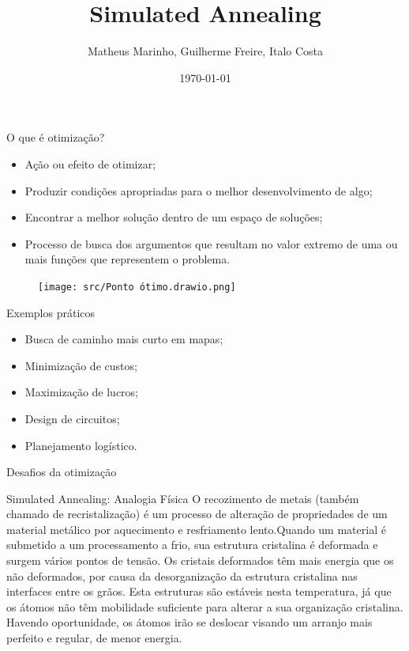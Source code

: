 \documentclass{beamer}
\title{Simulated Annealing}
\author{Matheus Marinho, Guilherme Freire, Italo Costa}
\date{\today}
\begin{document}
\frame{\titlepage}

\begin{frame}{O que é otimização?}
    \begin{itemize}
        \item Ação ou efeito de otimizar;
        \item Produzir condições apropriadas para o melhor desenvolvimento de algo;
        \item Encontrar a melhor solução dentro de um espaço de soluções;
        \item Processo de busca dos argumentos que resultam no valor extremo de uma ou mais funções que representem o problema.
    \end{itemize}
    \begin{figure}
        \texttt{[image: src/Ponto ótimo.drawio.png]}
    \end{figure}
\end{frame}

\begin{frame}{Exemplos práticos}
    \begin{itemize}
        \item Busca de caminho mais curto em mapas;
        \item Minimização de custos;
        \item Maximização de lucros;
        \item Design de circuitos;
        \item Planejamento logístico.
    \end{itemize}
\end{frame}

\begin{frame}{Desafios da otimização}
    
\end{frame}

\begin{frame}{Simulated Annealing: Analogia Física}
        O recozimento de metais (também chamado de recristalização) é um processo de alteração
    de propriedades de um material metálico por aquecimento e resfriamento lento.Quando um material é submetido a um processamento a frio, sua estrutura cristalina é
    deformada e surgem vários pontos de tensão. Os cristais deformados têm mais energia que os não
    deformados, por causa da desorganização da estrutura cristalina nas interfaces entre os grãos. Esta
    estruturas são estáveis nesta temperatura, já que os átomos não têm mobilidade suficiente para
    alterar a sua organização cristalina. Havendo oportunidade, os átomos irão se deslocar visando um
    arranjo mais perfeito e regular, de menor energia.
\end{frame}
\end{document}
